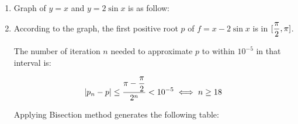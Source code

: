 \documentclass[../../../../Assignments.tex]{subfiles}
\begin{document}
\begin{solution}
    \begin{enumerate}[label = (\alph*)]
        \item Graph of \(y = x\) and \(y = 2 \sin{x}\) is as follow:

            \begin{center}
                
            \end{center}

        \item According to the graph, the first positive root \(p\) of \(f = x -
            2 \sin{x}\) is in \(\interval{\dfrac{\pi}{2}}{\pi}\).

            The number of iteration \(n\) needed to approximate \(p\) to within
            \(10^{-5}\) in that interval is:

            \[\abs{p_n - p} \leq \frac{\pi - \dfrac{\pi}{2}}{2^n} < 10^{-5} \iff n \geq 18\]

            Applying Bisection method generates the following table:


\end{enumerate}
\end{solution}
\end{document}
